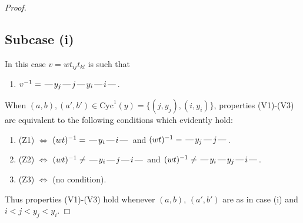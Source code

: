 \documentclass[10pt]{article}
\theoremstyle{definition}
\theoremstyle{definition}
\def\dash{\text{\hspace{0.5mm}---\hspace{0.5mm}}}
\def\Cyc{\mathrm{Cyc}}
\begin{document}
\begin{proof}
\subsection{Subcase (i)}
In this case $v = wt_{ij}t_{kl}$ is such that
\begin{enumerate}\item[]$v^{-1} = \dash y_j\dash j\dash y_i\dash i\dash $.\end{enumerate}
When $(a,b),(a',b')\in\Cyc^1(y)= \{(j,y_j),(i,y_i)\}$,
properties (V1)-(V3) are equivalent to the following conditions which evidently hold:
\begin{enumerate}
\item[](Z1) $\Leftrightarrow$ $(wt)^{-1} = \dash y_i \dash i \dash$  and $(wt)^{-1} = \dash y_j \dash j \dash$.
\item[](Z2) $\Leftrightarrow$ $(wt)^{-1} \neq \dash y_i \dash j \dash i \dash$ and $(wt)^{-1}\neq \dash y_i \dash y_j \dash i \dash$.
\item[](Z3) $\Leftrightarrow$ (no condition).
\end{enumerate}
Thus properties (V1)-(V3) hold whenever
$(a,b)$, $(a',b')$ are as in case (i) and $i < j < y_j < y_i$.

\end{proof}
\end{document}
